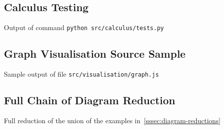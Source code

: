 \subsection{Calculus Testing}\label{ssec:appendix-calculus-tests}
    Output of command \texttt{python src/calculus/tests.py}
    \small\normalsize

\subsection{Graph Visualisation Source Sample}\label{ssec:appendix-graph-source}
    Sample output of file \texttt{src/visualisation/graph.js}
    \small\normalsize

\subsection{Full Chain of Diagram Reduction}\label{ssec:appendix-diagram-reduction}
    Full reduction of the union of the examples in~\ref{sssec:diagram-reductions}
